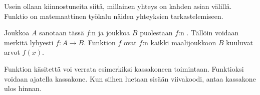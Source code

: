 Usein ollaan kiinnostuneita siitä, millainen yhteys on kahden asian välillä.
Funktio on matemaattinen työkalu näiden yhteyksien tarkastelemiseen.

  
  Joukkoa $A$ sanotaan tässä $f$:n  ja joukkoa $B$ puolestaan $f$:n . Tällöin voidaan merkitä lyhyesti $f\colon A \to B$. Funktion $f$  ovat $f$:n kaikki maalijoukkoon $B$ kuuluvat arvot $f(x)$.
   
  
Funktion käsitettä voi verrata esimerkiksi kassakoneen toimintaan. Funktioksi voidaan ajatella kassakone. Kun siihen luetaan sisään viivakoodi, antaa kassakone ulos hinnan.

